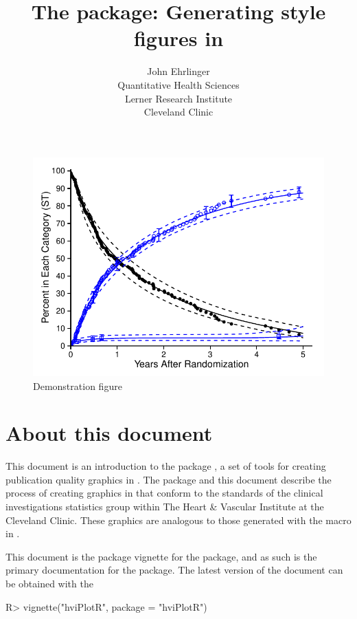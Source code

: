 \documentclass[nojss]{jss}\usepackage[]{graphicx}\usepackage[]{color}
\author{John Ehrlinger\\Quantitative Health Sciences\\Lerner Research Institute\\Cleveland Clinic} %
\title{The {\pkg{hviPlotR}} package: Generating \code{plot.sas} style figures in \proglang{R}}
\makeatletter
\def\maxwidth{ %
  \ifdim\Gin@nat@width>\linewidth
    \linewidth
  \else
    \Gin@nat@width
  \fi
}
\newenvironment{knitrout}{}{} %
\makeatother
\begin{document}

\begin{knitrout}\footnotesize
{}\color{fgcolor}\begin{figure}[htpb]


{\centering \includegraphics[width=\maxwidth]{figure/beamer-introFigure} 

}

\caption[Demonstration figure]{Demonstration figure\label{F:introFigure}}
\end{figure}


\end{knitrout}

\section{About this document}
This document is an introduction to the  package , a set of tools for creating publication quality graphics in . The package and this document describe the process of creating graphics in  that conform to the standards of the clinical investigations statistics group within The Heart \& Vascular Institute at the Cleveland Clinic. These graphics are analogous to those generated with the  macro in .

This document is the package vignette for the  package, and as such is the primary documentation for the package. The latest version of the document can be obtained with the 
\begin{CodeChunk}
\begin{CodeInput}
R> vignette("hviPlotR", package = "hviPlotR")
\end{CodeInput}
\end{CodeChunk}
\end{document}
